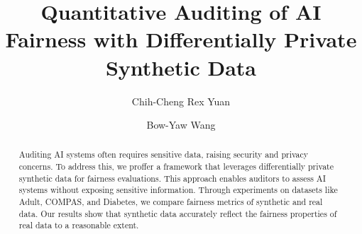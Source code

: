 \documentclass[manuscript,screen,review,anonymous]{acmart}
\begin{document}
\title{Quantitative Auditing of AI Fairness with Differentially Private Synthetic Data}

\author{Chih-Cheng Rex Yuan}

\author{Bow-Yaw Wang}


\begin{abstract}
Auditing AI systems often requires sensitive data, raising security and privacy concerns. To address this, we proffer a framework that leverages differentially private synthetic data for fairness evaluations. This approach enables auditors to assess AI systems without exposing sensitive information. Through experiments on datasets like Adult, COMPAS, and Diabetes, we compare fairness metrics of synthetic and real data. Our results show that synthetic data accurately reflect the fairness properties of real data to a reasonable extent.
\end{abstract}
\end{document}
